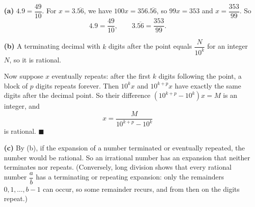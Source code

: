 \textbf{(a)} $4.9=\dfrac{49}{10}$. For $x=3.\overline{56}$, we have $100x=356.\overline{56}$, so $99x=353$ and $x=\dfrac{353}{99}$. So
\[\boxed{4.9=\dfrac{49}{10},\qquad 3.\overline{56}=\dfrac{353}{99}}.\]

\textbf{(b)} A terminating decimal with $k$ digits after the point equals $\dfrac N{10^k}$ for an integer $N$, so it is rational.

Now suppose $x$ eventually repeats: after the first $k$ digits following the point, a block of $p$ digits repeats forever. Then $10^kx$ and $10^{k+p}x$ have exactly the same digits after the decimal point. So their difference $\left(10^{k+p}-10^k\right)x=M$ is an integer, and
\[x=\dfrac{M}{10^{k+p}-10^k}\]
is rational. $\blacksquare$

\textbf{(c)} By (b), if the expansion of a number terminated or eventually repeated, the number would be rational. So an irrational number has an expansion that neither terminates nor repeats. (Conversely, long division shows that every rational number $\dfrac ab$ has a terminating or repeating expansion: only the remainders $0,1,\dots,b-1$ can occur, so some remainder recurs, and from then on the digits repeat.)
